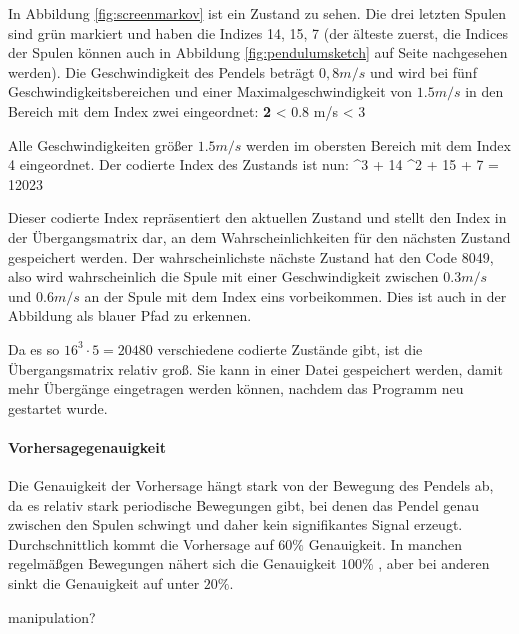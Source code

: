 In Abbildung \ref{fig:screenmarkov} ist ein Zustand zu sehen.
Die drei letzten Spulen sind grün markiert und haben die Indizes 14, 15, 7 (der älteste zuerst, die Indices der Spulen können auch in Abbildung \ref{fig:pendulumsketch} auf Seite \pageref{fig:pendulumsketch} nachgesehen werden).
Die Geschwindigkeit des Pendels beträgt $0,8 m/s$ und wird bei fünf Geschwindigkeitsbereichen und einer Maximalgeschwindigkeit von $1.5 m/s$ in den Bereich mit dem Index zwei eingeordnet:
\mathematik
\textbf{2}\cdot{} < 0.8 m/s < 3\cdot{}
\mathematikstop

Alle Geschwindigkeiten größer $1.5 m/s$ werden im obersten Bereich mit dem Index 4 eingeordnet.
Der codierte Index des Zustands ist nun:
 ^3 + 14 ^2 + 15  + 7 = 12023
\mathematikstop

Dieser codierte Index repräsentiert den aktuellen Zustand und stellt den Index in der Übergangsmatrix dar, an dem Wahrscheinlichkeiten für den nächsten Zustand gespeichert werden.
Der wahrscheinlichste nächste Zustand hat den Code 8049, also wird wahrscheinlich die Spule mit einer Geschwindigkeit zwischen $0.3 m/s$ und $0.6 m/s$ an der Spule mit dem Index eins vorbeikommen.
Dies ist auch in der Abbildung als blauer Pfad zu erkennen.

Da es so $16^3 \cdot 5 = 20480$ verschiedene codierte Zustände gibt, ist die Übergangsmatrix relativ groß.
Sie kann in einer Datei gespeichert werden, damit mehr Übergänge eingetragen werden können, nachdem das Programm neu gestartet wurde.

\paragraph{Vorhersagegenauigkeit}
Die Genauigkeit der Vorhersage hängt stark von der Bewegung des Pendels ab, da es relativ stark periodische Bewegungen gibt, bei denen das Pendel genau zwischen den Spulen schwingt und daher kein signifikantes Signal erzeugt.
Durchschnittlich kommt die Vorhersage auf $60\%$ Genauigkeit.
In manchen regelmäßgen Bewegungen nähert sich die Genauigkeit $100\%$ , aber bei anderen sinkt die Genauigkeit auf unter $20\%$.

\TODO manipulation?

